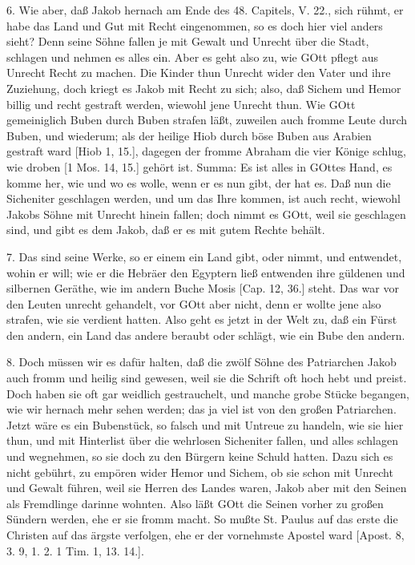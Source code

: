 6. Wie aber, daß Jakob hernach am Ende des 48. Capitels, V. 22., sich rühmt, er habe das Land und Gut mit Recht eingenommen, so es doch hier viel anders sieht? Denn seine Söhne fallen je mit Gewalt und Unrecht über die Stadt, schlagen und nehmen es alles ein. Aber es geht also zu, wie GOtt pflegt aus Unrecht Recht zu machen. Die Kinder thun Unrecht wider den Vater und ihre Zuziehung, doch kriegt es Jakob mit Recht zu sich; also, daß Sichem und Hemor billig und recht gestraft werden, wiewohl jene Unrecht thun. Wie GOtt gemeiniglich Buben durch Buben strafen läßt, zuweilen auch fromme Leute durch Buben, und wiederum; als der heilige Hiob durch böse Buben aus Arabien gestraft ward [Hiob 1, 15.], dagegen der fromme Abraham die vier Könige schlug, wie droben [1 Mos. 14, 15.] gehört ist. Summa: Es ist alles in GOttes Hand, es komme her, wie und wo es wolle, wenn er es nun gibt, der hat es. Daß nun die Sicheniter geschlagen werden, und um das Ihre kommen, ist auch recht, wiewohl Jakobs Söhne mit Unrecht hinein fallen; doch nimmt es GOtt, weil sie geschlagen sind, und gibt es dem Jakob, daß er es mit gutem Rechte behält.

7. Das sind seine Werke, so er einem ein Land gibt, oder nimmt, und entwendet, wohin er will; wie er die Hebräer den Egyptern ließ entwenden ihre güldenen und silbernen Geräthe, wie im andern Buche Mosis [Cap. 12, 36.] steht. Das war vor den Leuten unrecht gehandelt, vor GOtt aber nicht, denn er wollte jene also strafen, wie sie verdient hatten. Also geht es jetzt in der Welt zu, daß ein Fürst den andern, ein Land das andere beraubt oder schlägt, wie ein Bube den andern.

8. Doch müssen wir es dafür halten, daß die zwölf Söhne des Patriarchen Jakob auch fromm und heilig sind gewesen, weil sie die Schrift oft hoch hebt und preist. Doch haben sie oft gar weidlich gestrauchelt, und manche grobe Stücke begangen, wie wir hernach mehr sehen werden; das ja viel ist von den großen Patriarchen. Jetzt wäre es ein Bubenstück, so falsch und mit Untreue zu handeln, wie sie hier thun, und mit Hinterlist über die wehrlosen Sicheniter fallen, und alles schlagen und wegnehmen, so sie doch zu den Bürgern keine Schuld hatten. Dazu sich es nicht gebührt, zu empören wider Hemor und Sichem, ob sie schon mit Unrecht und Gewalt führen, weil sie Herren des Landes waren, Jakob aber mit den Seinen als Fremdlinge darinne wohnten. Also läßt GOtt die Seinen vorher zu großen Sündern werden, ehe er sie fromm macht. So mußte St. Paulus auf das erste die Christen auf das ärgste verfolgen, ehe er der vornehmste Apostel ward [Apost. 8, 3. 9, 1. 2. 1 Tim. 1, 13. 14.].

